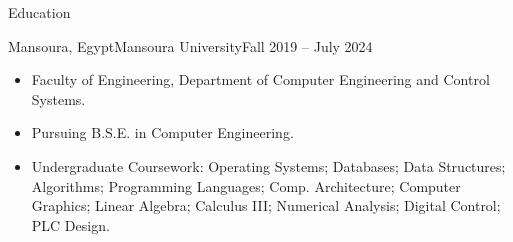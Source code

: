 \documentclass[]{cv}
\begin{document}
	\begin{cvsection}{Education}
	
	\vspace{3mm}

		\begin{cvsubsection}{Mansoura, Egypt}{Mansoura University}{Fall 2019 -- July 2024}
			\begin{itemize}
				\item Faculty of Engineering, Department of Computer Engineering and Control Systems.
				\item Pursuing B.S.E. in Computer Engineering.
				
				\item Undergraduate Coursework: Operating Systems; Databases; Data Structures; Algorithms; Programming Languages; Comp. Architecture; Computer Graphics; Linear Algebra; Calculus III; Numerical Analysis; Digital Control; PLC Design.
			\end{itemize}
		\end{cvsubsection}
	\end{cvsection}
	
\end{document}
